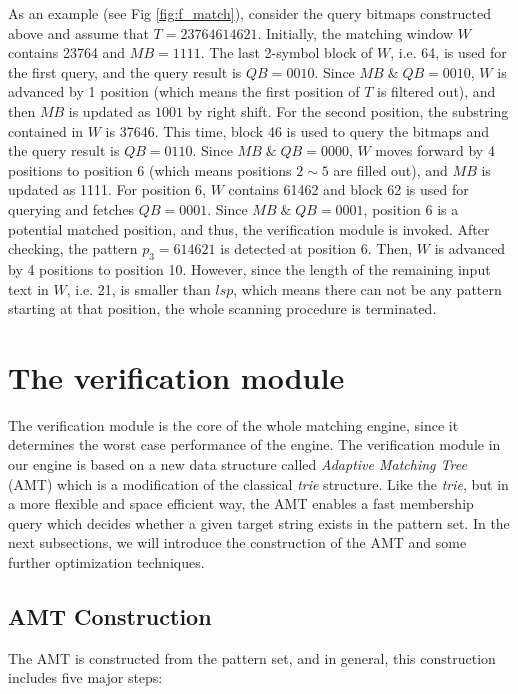\documentclass{article}
\begin{document}
As an example (see Fig \ref{fig:f_match}), consider the query bitmaps
constructed above and assume that $T=23764614621$.  Initially, the
matching window $W$ contains 23764 and $MB = 1111$.  The last 2-symbol
block of $W$, i.e. 64, is used for the first query, and the query
result is $QB=0010$. Since $MB\; \&\; QB = 0010$, $W$ is advanced by 1
position (which means the first position of $T$ is filtered out), and
then $MB$ is updated as $1001$ by right shift. For the second
position, the substring contained in $W$ is 37646. This time, block 46
is used to query the bitmaps and the query result is $QB=0110$. Since
$MB\; \& \; QB=0000$, $W$ moves forward by 4 positions to position 6
(which means positions $2 \sim 5$ are filled out), and $MB$ is updated
as 1111. For position 6, $W$ contains 61462 and block 62 is used for
querying and fetches $QB = 0001$. Since $MB\; \& \; QB = 0001$,
position 6 is a potential matched position, and thus, the verification
module is invoked. After checking, the pattern $p_3=614621$ is
detected at position 6. Then, $W$ is advanced by 4 positions to
position 10. However, since the length of the remaining input text in
$W$, i.e. 21, is smaller than $lsp$, which means there can not be any
pattern starting at that position, the whole scanning procedure is
terminated.

\section{The verification module}
\label{sec:verification}

The verification module is the core of the whole matching engine,
since it determines the worst case performance of the engine. The
verification module in our engine is based on a new data structure
called \emph{Adaptive Matching Tree} (AMT) which is a modification of
the classical \emph{trie} structure. Like the \emph{trie}, but in a
more flexible and space efficient way, the AMT enables a fast
membership query which decides whether a given target string exists in
the pattern set. In the next subsections, we will introduce the
construction of the AMT and some further optimization techniques.

\subsection{AMT Construction}
\label{subsec:amt}

The AMT is constructed from the pattern set, and in general, this
construction includes five major steps:
\end{document}
